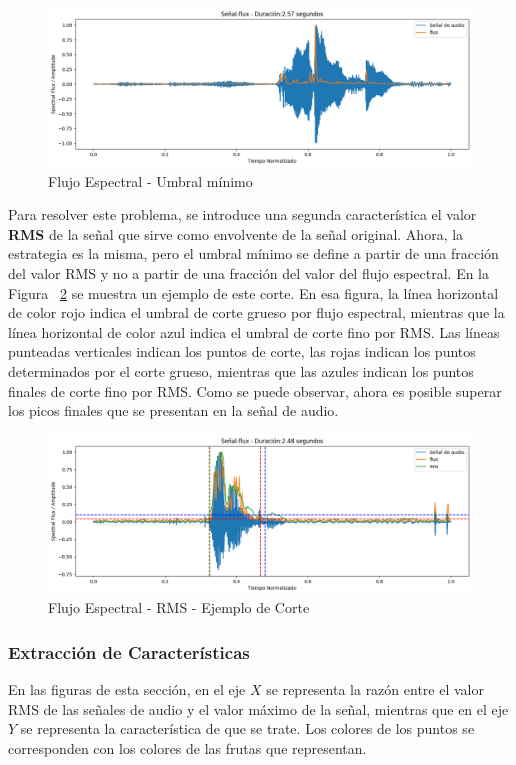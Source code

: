 \documentclass[a4paper, 12pt]{article}
\begin{document}
\begin{figure}[h]
    \centering
    \includegraphics[width=0.8\linewidth]{trimming3.png}
    \caption{Flujo Espectral - Umbral mínimo}
    \label{trimming 3}
\end{figure}

Para resolver este problema, se introduce una segunda característica el valor \textbf{RMS} de la señal que sirve como envolvente de la señal original. Ahora, la estrategia es la misma, pero el umbral mínimo se define a partir de una fracción del valor RMS y no a partir de una fracción del valor del flujo espectral. En la Figura ~\ref{trimming 4} se muestra un ejemplo de este corte. En esa figura, la línea horizontal de color rojo indica el umbral de corte grueso por flujo espectral, mientras que la línea horizontal de color azul indica el umbral de corte fino por RMS. Las líneas punteadas verticales indican los puntos de corte, las rojas indican los puntos determinados por el corte grueso, mientras que las azules indican los puntos finales de corte fino por RMS. Como se puede observar, ahora es posible superar los picos finales que se presentan en la señal de audio.


\begin{figure}[h]
    \centering
    \includegraphics[width=0.8\linewidth]{trimming4.png}
    \caption{Flujo Espectral - RMS - Ejemplo de Corte}
    \label{trimming 4}
\end{figure}
\subsubsection{Extracción de Características}
En las figuras de esta sección, en el eje \(X\) se representa la razón entre el valor RMS de las señales de audio y el valor máximo de la señal, mientras que en el eje \(Y\) se representa la característica de que se trate. Los colores de los puntos se corresponden con los colores de las frutas que representan.
\end{document}
